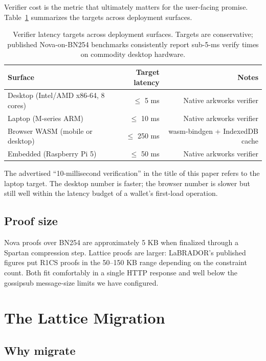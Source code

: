 \documentclass[11pt,a4paper]{article}
\begin{document}
Verifier cost is the metric that ultimately matters for the
user-facing promise. Table~\ref{tab:verifylatency} summarizes the
targets across deployment surfaces.

\begin{table}[h]
\centering
\begin{tabular}{lrr}
\toprule
\textbf{Surface} & \textbf{Target latency} & \textbf{Notes} \\
\midrule
Desktop (Intel/AMD x86-64, 8 cores)  & $\le$ 5 ms   & Native arkworks verifier \\
Laptop (M-series ARM)                & $\le$ 10 ms  & Native arkworks verifier \\
Browser WASM (mobile or desktop)     & $\le$ 250 ms & wasm-bindgen + IndexedDB cache \\
Embedded (Raspberry Pi 5)            & $\le$ 50 ms  & Native arkworks verifier \\
\bottomrule
\end{tabular}
\caption{Verifier latency targets across deployment surfaces. Targets
are conservative; published Nova-on-BN254 benchmarks consistently
report sub-5-ms verify times on commodity desktop hardware.}
\label{tab:verifylatency}
\end{table}

The advertised ``10-millisecond verification'' in the title of this
paper refers to the laptop target. The desktop number is faster; the
browser number is slower but still well within the latency budget of
a wallet's first-load operation.

\subsection{Proof size}

Nova proofs over BN254 are approximately 5 KB when finalized through a
Spartan compression step. Lattice proofs are larger: LaBRADOR's
published figures put R1CS proofs in the 50--150 KB range depending on
the constraint count. Both fit comfortably in a single HTTP response
and well below the gossipsub message-size limits we have configured.

\section{The Lattice Migration}
\label{sec:lattice}

\subsection{Why migrate}
\end{document}
